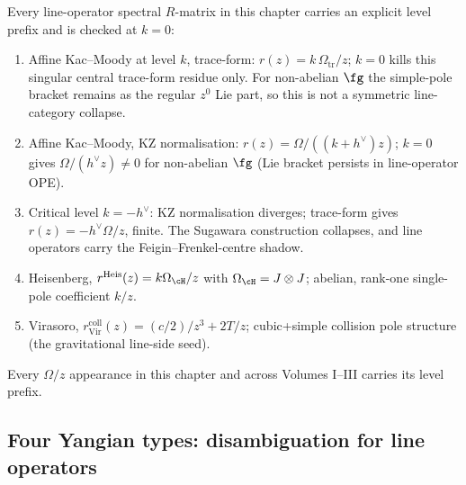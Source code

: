 \begin{convention}
\label{conv:line-operators-rmatrix-level-prefix}
Every line-operator spectral $R$-matrix in this chapter carries an
explicit level prefix and is checked at $k=0$:
\begin{enumerate}[label=\textup{(\roman*)}]
\item Affine Kac--Moody at level $k$, trace-form: $r(z) = k\,\Omega_{\mathrm{tr}}/z$;
$k=0$ kills this singular central trace-form residue only. For
non-abelian $\fg$ the simple-pole bracket remains as the regular
$z^0$ Lie part, so this is not a symmetric line-category collapse.
\item Affine Kac--Moody, KZ normalisation: $r(z) = \Omega/((k+h^\vee)z)$;
$k=0$ gives $\Omega/(h^\vee z)\ne 0$ for non-abelian $\fg$ (Lie
bracket persists in line-operator OPE).
\item Critical level $k=-h^\vee$: KZ normalisation diverges; trace-form
gives $r(z) = -h^\vee \Omega/z$, finite. The Sugawara construction
collapses, and line operators carry the Feigin--Frenkel-centre
shadow.
\item Heisenberg,
$r^{\mathrm{Heis}}(z)=k\Omega_{\cH}/z$ with
$\Omega_{\cH}=J\otimes J$; abelian, rank-one single-pole coefficient
$k/z$.
\item Virasoro,
\(r_{\mathrm{Vir}}^{\mathrm{coll}}(z) = (c/2)/z^3 + 2T/z\);
cubic+simple collision pole structure (the gravitational line-side seed).
\end{enumerate}
Every $\Omega/z$ appearance in this chapter and across Volumes
I--III carries its level prefix.
\end{convention}

\subsection{Four Yangian types: disambiguation for line operators}
\label{subsec:line-operators-yangian-types}

